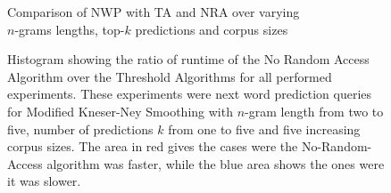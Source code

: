 \begin{figure}[p!]
  \centering
  Comparison of NWP with TA and NRA over varying\\
  $n$-grams lengths, top-$k$ predictions and corpus sizes
  \\[1.5ex]
  \begin{minipage}{1.4\textwidth}
    \centering
    \hspace{-0.2\textwidth}
    
  \end{minipage}
  \caption{Histogram showing the ratio of runtime of the No Random Access
    Algorithm over the Threshold Algorithms for all performed experiments.
    These experiments were next word prediction queries for Modified Kneser-Ney
    Smoothing with $n$-gram length from two to five, number of predictions $k$
    from one to five and five increasing corpus sizes.
    The area in red gives the cases were the No-Random-Access algorithm was
    faster, while the blue area shows the ones were it was slower.}
  \label{fig:evaluation-comp-nra-ta}
\end{figure}


